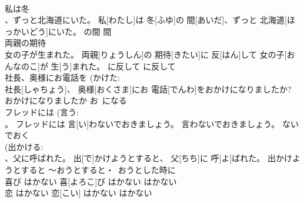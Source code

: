\documentclass[8pt]{extreport}
\begin{document}
\begin{CJK}{UTF8}{min}
\\	私は冬 
\\	、ずっと北海道にいた。	私[わたし]は 冬[ふゆ]の 間[あいだ]、ずっと 北海道[ほっかいどう]にいた。	の間	間	
\\	両親の期待 
\\	女の子が生まれた。	両親[りょうしん]の 期待[きたい]に 反[はん]して 女の子[おんなのこ]が 生[う]まれた。	に反して	に反して	
\\	社長、奥様にお電話を (かけた: 
\\	社長[しゃちょう]、 奥様[おくさま]にお 電話[でんわ]をおかけになりましたか?	おかけになりましたか	お~になる	
\\	フレッドには (言う: 
\\	。	フレッドには 言[い]わないでおきましょう。	言わないでおきましょう。	ないでおく	
\\	(出かける: 
\\	、父に呼ばれた。	出[で]かけようとすると、 父[ちち]に 呼[よ]ばれた。	出かけようとすると	～おうとすると・~おうとした時に	
\\	喜び	はかない 喜[よろこ]び	はかない	はかない~	
\\	恋	はかない 恋[こい]	はかない	はかない~	
\end{CJK}
\end{document}
